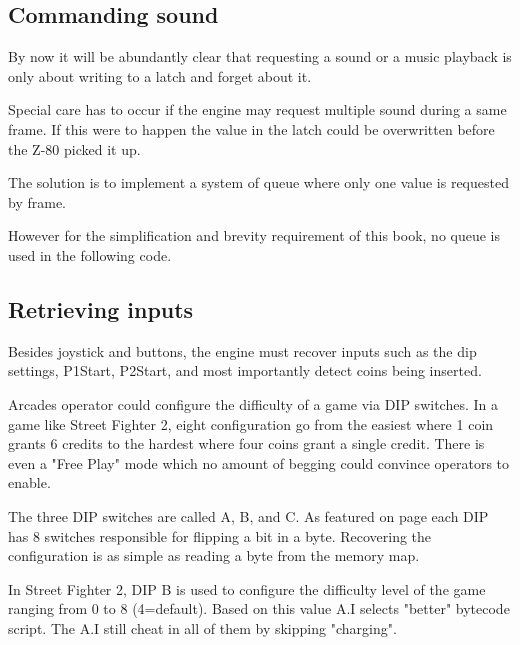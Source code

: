 \subsection{Commanding sound}
By now it will be abundantly clear that requesting a sound or a music playback is only about writing to a latch and forget about it. 

Special care has to occur if the engine may request multiple sound during a same frame. If this were to happen the value in the latch could be overwritten before the Z-80 picked it up.

The solution is to implement a system of queue where only one value is requested by frame.

However for the simplification and brevity requirement of this book, no queue is used in the following code.

 


\subsection{Retrieving inputs}
Besides joystick and buttons, the engine must recover inputs such as the dip settings, P1Start, P2Start, and most importantly detect coins being inserted.

\begin{trivia}
Arcades operator could configure the difficulty of a game via DIP switches. In a game like Street Fighter 2, eight configuration go from the easiest where 1 coin grants 6 credits to the hardest where four coins grant a single credit. There is even a "Free Play" mode which no amount of begging could convince operators to enable\cite{sf2manual}.
\end{trivia}

The three DIP switches are called A, B, and C. As featured on page \pageref{fig:boarda} each DIP has 8 switches responsible for flipping a bit in a byte. Recovering the configuration is as simple as reading a byte from the memory map.

\begin{trivia}
In Street Fighter 2, DIP B is used to configure the difficulty level of the game ranging from 0 to 8 (4=default). Based on this value A.I selects "better" bytecode\cite{sf2aiengine} script. The A.I still cheat in all of them by skipping "charging"\cite{sf2aiengine}.
\end{trivia}



